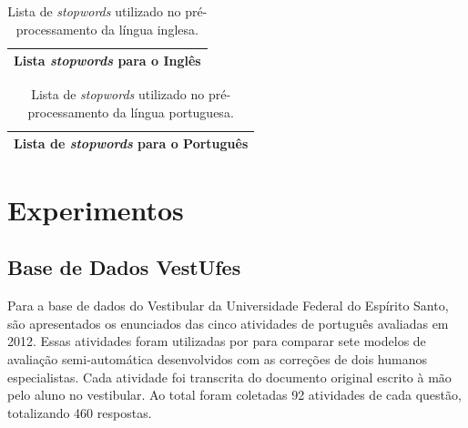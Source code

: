 \begin{table}[h]
\centering
\renewcommand\arraystretch{0.8}
\begin{tabular}{ccccc}
\hline
\multicolumn{5}{c}{Lista \textit{stopwords} para o Inglês} \\
\hline



\hline
\hline
\end{tabular}
\caption{Lista de \textit{stopwords} utilizado no pré-processamento da língua inglesa.}
\label{tab-stopwords-en}
\end{table}

\begin{table}[h]
\centering
\renewcommand\arraystretch{0.8}
\begin{tabular}{ccccc}
\hline
\multicolumn{5}{c}{Lista de \textit{stopwords} para o Português} \\
\hline



\hline
\hline
\end{tabular}
\caption{Lista de \textit{stopwords} utilizado no pré-processamento da língua portuguesa.}
\label{tab-stopwords-pt}
\end{table}

\chapter{Experimentos}
\section{Base de Dados VestUfes}\label{sec-enunciados-vestufes}
Para a base de dados do Vestibular da Universidade Federal do Espírito Santo, são apresentados os enunciados das cinco atividades de português avaliadas em 2012. Essas atividades foram utilizadas por \cite{pissinati2014-master} para comparar sete modelos de avaliação semi-automática desenvolvidos com as correções de dois humanos especialistas. Cada atividade foi transcrita do documento original escrito à mão pelo aluno no vestibular. Ao total foram coletadas 92 atividades de cada questão, totalizando 460 respostas.

